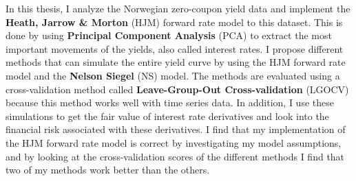 
\noindent In this thesis, I analyze the Norwegian zero-coupon yield data and implement the \textbf{Heath, Jarrow \& Morton} (HJM) forward rate model to this dataset. This is done by using \textbf{Principal Component Analysis} (PCA) to extract the most important movements of the yields, also called interest rates. I propose different methods that can simulate the entire yield curve by using the HJM forward rate model and the \textbf{Nelson Siegel} (NS) model. The methods are evaluated using a cross-validation method called \textbf{Leave-Group-Out Cross-validation} (LGOCV) because this method works well with time series data. In addition, I use these simulations to get the fair value of interest rate derivatives and look into the financial risk associated with these derivatives. I find that my implementation of the HJM forward rate model is correct by investigating my model assumptions, and by looking at the cross-validation scores of the different methods I find that two of my methods work better than the others.

